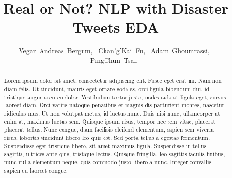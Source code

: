 \documentclass[journal, ]{IEEEtran}
\begin{document}
\title{Real or Not? NLP with Disaster Tweets EDA}

\author{Vegar~Andreas~Bergum,~
        Chan'g'Kai~Fu,~
        Adam~Ghoumrassi,~
        PingChun~Tsai,~%
 }

{}

\maketitle

\begin{abstract}
Lorem ipsum dolor sit amet, consectetur adipiscing elit. Fusce eget erat mi.
Nam non diam felis. Ut tincidunt, mauris eget ornare sodales, orci ligula
bibendum dui, id tristique augue arcu eu dolor. Vestibulum tortor justo,
malesuada at ligula eget, cursus laoreet diam. Orci varius natoque penatibus et
magnis dis parturient montes, nascetur ridiculus mus. Ut non volutpat metus, id
luctus nunc. Duis nisi nunc, ullamcorper at enim at, maximus luctus sem.
Quisque ipsum risus, tempor nec sem vitae, placerat placerat tellus. Nunc
congue, diam facilisis eleifend elementum, sapien sem viverra risus, lobortis
tincidunt libero leo quis est. Sed porta tellus a egestas fermentum.
Suspendisse eget tristique libero, sit amet maximus ligula. Suspendisse in
tellus sagittis, ultrices ante quis, tristique lectus. Quisque fringilla, leo
sagittis iaculis finibus, nunc nulla elementum neque, quis commodo justo libero
a nunc. Integer convallis sapien eu laoreet congue.
\end{abstract}%

\IEEEpeerreviewmaketitle

\end{document}
